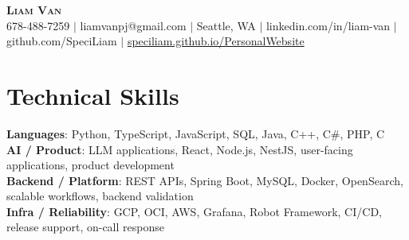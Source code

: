 \documentclass[letterpaper,11pt]{article}
\begin{document}

%
\begin{center}
    \textbf{\Huge \scshape Liam Van} \\ \vspace{1pt}
    \small 678-488-7259 $|$ \small {liamvanpj@gmail.com} $|$ Seattle, WA
 {{$|$ linkedin.com/in/liam-van} {$|$ github.com/SpeciLiam} {$|$ \href{https://speciliam.github.io/PersonalWebsite}{speciliam.github.io/PersonalWebsite}}}

\end{center}

\section{Technical Skills}
 \begin{itemize}[leftmargin=0.15in, label={}]
    \small{\item{
     \textbf{Languages}{: Python, TypeScript, JavaScript, SQL, Java, C++, C\#, PHP, C} \\
     \textbf{AI / Product}{: LLM applications, React, Node.js, NestJS, user-facing applications, product development} \\
     \textbf{Backend / Platform}{: REST APIs, Spring Boot, MySQL, Docker, OpenSearch, scalable workflows, backend validation} \\
     \textbf{Infra / Reliability}{: GCP, OCI, AWS, Grafana, Robot Framework, CI/CD, release support, on-call response} \\
    }}
 \end{itemize}
%
\end{document}
